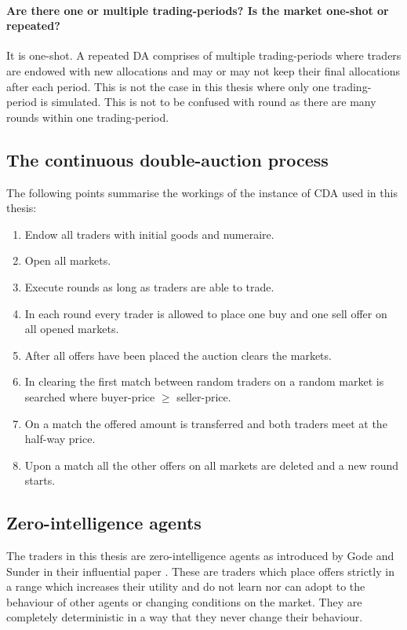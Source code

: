 \documentclass[../Bachelorarbeit.tex]{subfiles}
\begin{document}
\paragraph{Are there one or multiple trading-periods? Is the market one-shot or repeated?} It is one-shot. A repeated DA comprises of multiple trading-periods where traders are endowed with new allocations and may or may not keep their final allocations after each period. This is not the case in this thesis where only one trading-period is simulated. This is not to be confused with \Gls{round} as there are many rounds within one trading-period.

\subsection{The continuous double-auction process}

The following points summarise the workings of the instance of CDA used in this thesis:

\begin{enumerate}
\item Endow all traders with initial goods and numeraire.
\item Open all markets.
\item Execute rounds as long as traders are able to trade.
\item In each round every trader is allowed to place one buy and one sell offer on all opened markets.
\item After all offers have been placed the auction clears the markets.
\item In clearing the first match between random traders on a random market is searched where buyer-price $\geq$ seller-price.
\item On a match the offered amount is transferred and both traders meet at the half-way price.
\item Upon a match all the other offers on all markets are deleted and a new round starts.
\end{enumerate}

\subsection{Zero-intelligence agents}
The traders in this thesis are zero-intelligence agents as introduced by Gode and Sunder in their influential paper \cite{GodeSunder1993}. These are traders which place offers strictly in a range which increases their utility and do not learn nor can adopt to the behaviour of other agents or changing conditions on the market. They are completely deterministic in a way that they never change their behaviour. 
\end{document}
